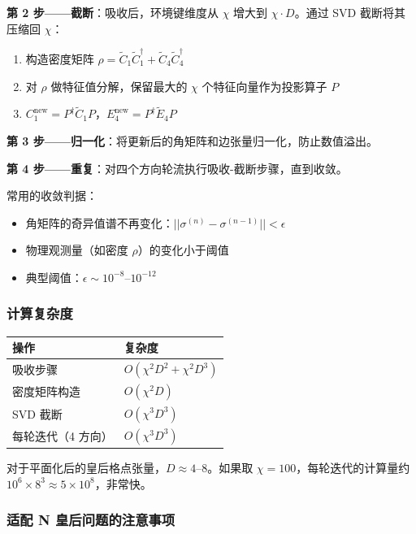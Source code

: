 \documentclass[12pt,a4paper]{ctexart}
\begin{document}
\textbf{第 2 步——截断}：吸收后，环境键维度从 $\chi$ 增大到 $\chi \cdot D$。通过 SVD 截断将其压缩回 $\chi$：
\begin{enumerate}
\item 构造密度矩阵 $\rho = \widetilde{C}_1 \widetilde{C}_1^\dagger + \widetilde{C}_4 \widetilde{C}_4^\dagger$
\item 对 $\rho$ 做特征值分解，保留最大的 $\chi$ 个特征向量作为投影算子 $P$
\item $C_1^{\text{new}} = P^\dagger \widetilde{C}_1 P$，$E_4^{\text{new}} = P^\dagger \widetilde{E}_4 P$
\end{enumerate}

\textbf{第 3 步——归一化}：将更新后的角矩阵和边张量归一化，防止数值溢出。

\textbf{第 4 步——重复}：对四个方向轮流执行吸收-截断步骤，直到收敛。

\begin{tcolorbox}[title=CTMRG 收敛判据, colback=green!5, colframe=darkgreen]
常用的收敛判据：
\begin{itemize}
\item 角矩阵的奇异值谱不再变化：$||\sigma^{(n)} - \sigma^{(n-1)}|| < \epsilon$
\item 物理观测量（如密度 $\rho$）的变化小于阈值
\item 典型阈值：$\epsilon \sim 10^{-8}$--$10^{-12}$
\end{itemize}
\end{tcolorbox}

\subsubsection{计算复杂度}

\begin{center}
\begin{tabular}{ll}
\toprule
操作 & 复杂度 \\
\midrule
吸收步骤 & $O(\chi^2 D^2 + \chi^2 D^3)$ \\
密度矩阵构造 & $O(\chi^2 D)$ \\
SVD 截断 & $O(\chi^3 D^3)$ \\
每轮迭代（4 方向） & $O(\chi^3 D^3)$ \\
\bottomrule
\end{tabular}
\end{center}

对于平面化后的皇后格点张量，$D \approx 4$--$8$。如果取 $\chi = 100$，每轮迭代的计算量约 $10^6 \times 8^3 \approx 5 \times 10^8$，非常快。

\subsubsection{适配 N 皇后问题的注意事项}
\end{document}
